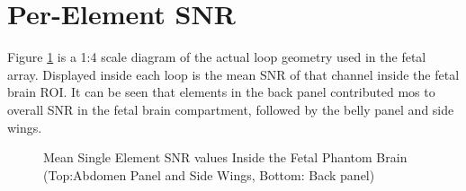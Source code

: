 \section{Per-Element SNR}
Figure \ref{fig:loop_snr_contributions} is a 1:4 scale diagram of the actual loop geometry used in the fetal array.
Displayed inside each loop is the mean SNR of that channel inside the fetal brain ROI. It can be seen that elements in
the back panel contributed mos to overall SNR in the fetal brain compartment, followed by the belly panel and side wings.

\begin{figure}
\caption{Mean Single Element SNR values Inside the Fetal Phantom Brain (Top:Abdomen Panel and Side Wings, Bottom: Back
panel)}
\label{fig:loop_snr_contributions}
\end{figure}
